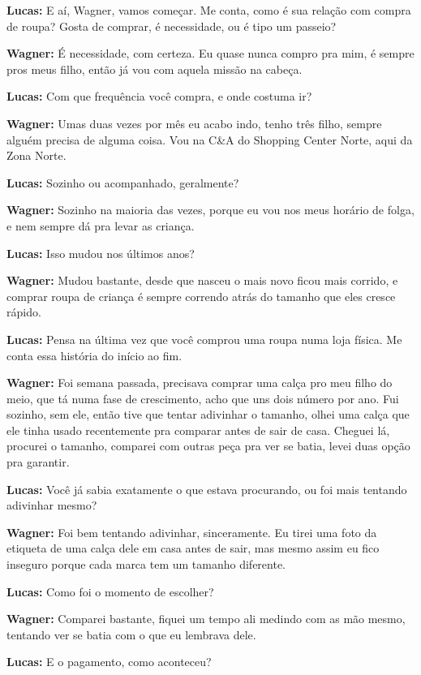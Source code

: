 \textbf{Lucas:} E aí, Wagner, vamos começar. Me conta, como é sua relação com compra de roupa? Gosta de comprar, é necessidade, ou é tipo um passeio?

\textbf{Wagner:} É necessidade, com certeza. Eu quase nunca compro pra mim, é sempre pros meus filho, então já vou com aquela missão na cabeça.

\textbf{Lucas:} Com que frequência você compra, e onde costuma ir?

\textbf{Wagner:} Umas duas vezes por mês eu acabo indo, tenho três filho, sempre alguém precisa de alguma coisa. Vou na C\&A do Shopping Center Norte, aqui da Zona Norte.

\textbf{Lucas:} Sozinho ou acompanhado, geralmente?

\textbf{Wagner:} Sozinho na maioria das vezes, porque eu vou nos meus horário de folga, e nem sempre dá pra levar as criança.

\textbf{Lucas:} Isso mudou nos últimos anos?

\textbf{Wagner:} Mudou bastante, desde que nasceu o mais novo ficou mais corrido, e comprar roupa de criança é sempre correndo atrás do tamanho que eles cresce rápido.

\textbf{Lucas:} Pensa na última vez que você comprou uma roupa numa loja física. Me conta essa história do início ao fim.

\textbf{Wagner:} Foi semana passada, precisava comprar uma calça pro meu filho do meio, que tá numa fase de crescimento, acho que uns dois número por ano. Fui sozinho, sem ele, então tive que tentar adivinhar o tamanho, olhei uma calça que ele tinha usado recentemente pra comparar antes de sair de casa. Cheguei lá, procurei o tamanho, comparei com outras peça pra ver se batia, levei duas opção pra garantir.

\textbf{Lucas:} Você já sabia exatamente o que estava procurando, ou foi mais tentando adivinhar mesmo?

\textbf{Wagner:} Foi bem tentando adivinhar, sinceramente. Eu tirei uma foto da etiqueta de uma calça dele em casa antes de sair, mas mesmo assim eu fico inseguro porque cada marca tem um tamanho diferente.

\textbf{Lucas:} Como foi o momento de escolher?

\textbf{Wagner:} Comparei bastante, fiquei um tempo ali medindo com as mão mesmo, tentando ver se batia com o que eu lembrava dele.

\textbf{Lucas:} E o pagamento, como aconteceu?


